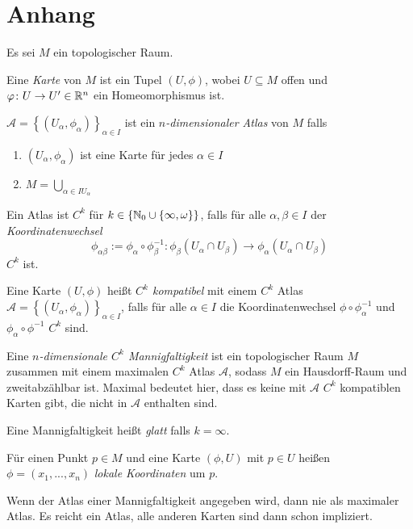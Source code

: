 \chapter{Anhang}

\begin{definition}
    \label{anh.def: mannigfaltigkeit}
    Es sei $M$ ein topologischer Raum. 
    
    Eine \textit{Karte} von $M$ ist ein Tupel
    $(U, \phi)$, wobei $U \subseteq M$ offen und $\varphi \colon U \to U' \in { \mathbb R }^n$ 
    ein Homeomorphismus ist.

    $\mathcal{A} = \left\{ (U_{\alpha}, \phi_{\alpha}) \right\}_{\alpha \in I}$ ist ein 
    \textit{$n$-dimensionaler Atlas} von $M$ falls
    \begin{enumerate}
        \item $(U_{\alpha}, \phi_{\alpha})$ ist eine Karte für jedes $\alpha \in I$
        \item $M = \bigcup_{\alpha \in I U_{\alpha}}$
    \end{enumerate}
    Ein Atlas ist $C^k$ für $k \in \{ { \mathbb N }_0 \cup \{ \infty, \omega \} \}$, falls für
    alle $\alpha, \beta \in I$ der \textit{Koordinatenwechsel} 
    \[ 
        \phi_{\alpha \beta} := 
        \phi_{\alpha} \circ \phi_{\beta}^{-1} \colon 
        \phi_{\beta} (U_{\alpha} \cap U_{\beta}) \to \phi_{\alpha} (U_{\alpha} \cap U_{\beta})
    \]
    $C^k$ ist.
    
    Eine Karte $(U, \phi)$ heißt \textit{$C^k$ kompatibel} mit einem $C^k$ Atlas 
    $\mathcal{A} = \left\{ (U_{\alpha}, \phi_{\alpha}) \right\}_{\alpha \in I}$,
    falls für alle $\alpha \in I$ die Koordinatenwechsel $\phi \circ \phi_{\alpha}^{-1}$
    und $\phi_{\alpha} \circ \phi^{-1}$ $C^k$ sind.

    Eine \textit{$n$-dimensionale $C^k$ Mannigfaltigkeit} ist ein topologischer Raum $M$ 
    zusammen mit einem maximalen $C^k$ Atlas $\mathcal{A}$, sodass $M$ ein Hausdorff-Raum und
    zweitabzählbar ist. Maximal bedeutet hier, dass es keine mit $\mathcal{A}$ $C^k$ 
    kompatiblen Karten gibt, die nicht in $\mathcal{A}$ enthalten sind.

    Eine Mannigfaltigkeit heißt \textit{glatt} falls $k = \infty$.

    Für einen Punkt $p \in M$ und eine Karte $(\phi, U)$ mit $p \in U$ 
    heißen $\phi = (x_1, ..., x_n)$ \textit{lokale Koordinaten} um $p$.
\end{definition}

\begin{remark}
    Wenn der Atlas einer Mannigfaltigkeit angegeben wird, dann nie als maximaler Atlas.
    Es reicht ein Atlas, alle anderen Karten sind dann schon impliziert.
\end{remark}

